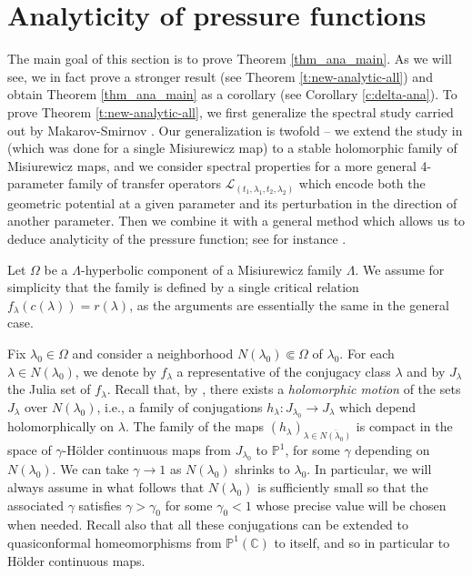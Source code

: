 \documentclass[11pt]{amsart}
\theoremstyle{plain}
\theoremstyle{definition}
\theoremstyle{remark}
\begin{document}
\section{Analyticity of pressure functions}
\label{sec_3}
The main goal of this section is to prove Theorem \ref{thm_ana_main}. As we will see, we in fact prove a stronger result (see Theorem \ref{t:new-analytic-all}) and obtain Theorem \ref{thm_ana_main} as a corollary (see Corollary \ref{c:delta-ana}). To prove Theorem \ref{t:new-analytic-all}, we first generalize the spectral study
carried out by Makarov-Smirnov \cite{MakSmir03}. 
Our generalization is twofold -- we extend the study in \cite{MakSmir03} (which was done for a single Misiurewicz map) to a stable holomorphic family of Misiurewicz maps, and we consider spectral properties for a more general 4-parameter family of transfer operators $\mathcal{L}_{(t_1,\lambda_1,t_2,\lambda_2)}$ which encode both the geometric potential at a given parameter and its perturbation in the direction of 
another parameter.
Then we combine it with a general method which allows us to deduce analyticity of the pressure function; see for instance \cite{SU10}. 

\medskip

Let $\Omega$ be a $\Lambda$-hyperbolic component of a Misiurewicz family $\Lambda$. We assume
for simplicity 
that the family is defined by a single critical relation $f_\lambda (c(\lambda))=r(\lambda)$, as the arguments are essentially the same in the general case.

Fix $\lambda_0 \in \Omega$ and consider a neighborhood $N(\lambda_0)\Subset \Omega$ of $\lambda_0$.
For each $\lambda \in N(\lambda_0)$, we denote by $f_\lambda$ a representative of the conjugacy class $\lambda$
and by
$J_\lambda$ the Julia set of $f_\lambda$.
Recall that, by \cite{MSS83, Lyu83typical}, there exists a \emph{holomorphic motion} of the sets
$J_\lambda$ over $N(\lambda_0)$, i.e.,
a family of conjugations
$h_\lambda \colon J_{ \lambda_0} \to J_\lambda$ which depend
holomorphically on $\lambda$. The family of the maps $(h_\lambda)_{\lambda \in \overline{N(\lambda_0)}}$
is compact in the space of 
$\gamma$-H\"older continuous
maps 
from $J_{ \lambda_0}$
to $\mathbb P^1$, for some $\gamma$ depending on $N(\lambda_0)$. We  can take 
 $\gamma\to 1$ 
 as
 $N(\lambda_0)$ shrinks
 to $\lambda_0$. In particular, we will always assume in what follows that
 $N(\lambda_0)$ is sufficiently small so that the associated $\gamma$ satisfies $\gamma>\gamma_0$ for some $\gamma_0<1$ whose precise value will be chosen when needed.
  Recall also that all these conjugations can be extended to 
 quasiconformal homeomorphisms
 from
$\mathbb P^1(\mathbb C)$ to itself,
and so
 in particular to H\"older continuous maps.
 
\end{document}
